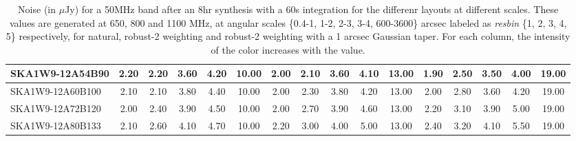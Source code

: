 \begin{table}[H]
{{\begin{tabular}{|lccccc||ccccc||ccccc|}
SKA1W9-12A54B90 & 2.20 \cellcolor{blue!28.50} & 2.20 \cellcolor{red!21.23} & 3.60 \cellcolor{green!18.00} & 4.20 \cellcolor{orange!18.00} & 10.00 \cellcolor{purple!60.00} & 2.00 \cellcolor{blue!18.00} & 2.10 \cellcolor{red!18.00} & 3.60 \cellcolor{green!18.00} & 4.10 \cellcolor{orange!18.00} & 13.00 \cellcolor{purple!18.00} & 1.90 \cellcolor{blue!18.00} & 2.50 \cellcolor{red!18.00} & 3.50 \cellcolor{green!18.00} & 4.00 \cellcolor{orange!18.00} & 19.00 \cellcolor{purple!60.00}\\ \hline 
SKA1W9-12A60B100 & 2.10 \cellcolor{blue!23.25} & 2.10 \cellcolor{red!18.00} & 3.80 \cellcolor{green!27.33} & 4.40 \cellcolor{orange!34.80} & 10.00 \cellcolor{purple!60.00} & 2.00 \cellcolor{blue!18.00} & 2.30 \cellcolor{red!24.00} & 3.80 \cellcolor{green!30.00} & 4.20 \cellcolor{orange!22.67} & 13.00 \cellcolor{purple!18.00} & 2.00 \cellcolor{blue!22.67} & 2.80 \cellcolor{red!32.00} & 3.60 \cellcolor{green!25.00} & 4.20 \cellcolor{orange!23.60} & 19.00 \cellcolor{purple!60.00}\\ \hline 
SKA1W9-12A72B120 & 2.00 \cellcolor{blue!18.00} & 2.40 \cellcolor{red!27.69} & 3.90 \cellcolor{green!32.00} & 4.50 \cellcolor{orange!43.20} & 10.00 \cellcolor{purple!60.00} & 2.00 \cellcolor{blue!18.00} & 2.70 \cellcolor{red!36.00} & 3.90 \cellcolor{green!36.00} & 4.60 \cellcolor{orange!41.33} & 13.00 \cellcolor{purple!18.00} & 2.20 \cellcolor{blue!32.00} & 3.10 \cellcolor{red!46.00} & 3.90 \cellcolor{green!46.00} & 5.00 \cellcolor{orange!46.00} & 19.00 \cellcolor{purple!60.00}\\ \hline 
SKA1W9-12A80B133 & 2.10 \cellcolor{blue!23.25} & 2.60 \cellcolor{red!34.15} & 4.10 \cellcolor{green!41.33} & 4.70 \cellcolor{orange!60.00} & 10.00 \cellcolor{purple!60.00} & 2.20 \cellcolor{blue!28.50} & 3.00 \cellcolor{red!45.00} & 4.00 \cellcolor{green!42.00} & 5.00 \cellcolor{orange!60.00} & 13.00 \cellcolor{purple!18.00} & 2.40 \cellcolor{blue!41.33} & 3.20 \cellcolor{red!50.67} & 4.10 \cellcolor{green!60.00} & 5.50 \cellcolor{orange!60.00} & 19.00 \cellcolor{purple!60.00}\\ \hline 
\end{tabular}}
\vspace{-0.300000cm}
\hspace{1cm} 

\vspace{.50cm}
\caption{Noise (in $\mu$Jy) for a 50MHz band after an 8hr synthesis with a 60s integration for the differenr layouts at different scales. These values are generated at 650, 800 and 1100 MHz, at angular scales \{0.4-1, 1-2, 2-3, 3-4, 600-3600\} arcsec labeled as {\it resbin} \{1, 2, 3, 4, 5\} respectively, for natural, robust-2 weighting and robust-2 weighting with a 1 arcsec Gaussian taper. For each column, the intensity of the color increases with the value.}\label{tab:noise50}}
 \end{table}

